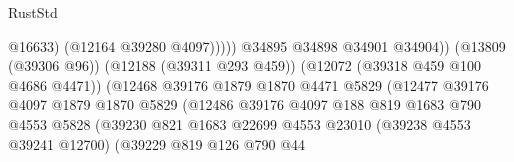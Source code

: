 \begin{lexlean}{RustStd}
\begin{coremodule}
                                                              @16633)
                                                            (@12164 @39280 @4097)))))
                                                    @34895
                                                    @34898
                                                    @34901
                                                    @34904))
                                                (@13809 (@39306 @96))
                                                (@12188 (@39311 @293 @459))
                                                (@12072 (@39318 @459 @100 @4686 @4471))
                                                (@12468
                                                  @39176
                                                  @1879
                                                  @1870
                                                  @4471
                                                  @5829
                                                  (@12477
                                                    @39176
                                                    @4097
                                                    @1879
                                                    @1870
                                                    @5829
                                                    (@12486
                                                      @39176
                                                      @4097
                                                      @188
                                                      @819
                                                      @1683
                                                      @790
                                                      @4553
                                                      @5828
                                                      (@39230
                                                        @821
                                                        @1683
                                                        @22699
                                                        @4553
                                                        @23010
                                                        (@39238 @4553 @39241 @12700)
                                                        (@39229
                                                          @819
                                                          @126
                                                          @790
                                                          @44

\end{coremodule}
\end{lexlean}
